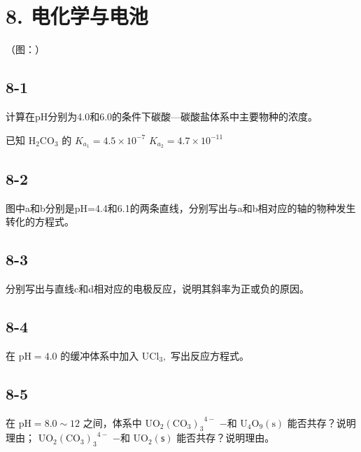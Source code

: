 \section*{8. 电化学与电池}
（图：）

\subsection*{8-1}
计算在pH分别为4.0和6.0的条件下碳酸—碳酸盐体系中主要物种的浓度。

已知 $\mathrm { H _ { 2 } C O _ { 3 } }$ 的 $K _ { a _ { 1 } } = 4 . 5 \times 1 0 ^ { - 7 }$ $K _ { a _ { 2 } } = 4 . 7 \times 1 0 ^ { - 1 1 }$

\subsection*{8-2}
图中a和b分别是pH=4.4和6.1的两条直线，分别写出与a和b相对应的轴的物种发⽣转化的⽅程式。

\subsection*{8-3}
分别写出与直线c和d相对应的电极反应，说明其斜率为正或负的原因。

\subsection*{8-4}
在 $\mathrm { p H } = 4 . 0$ 的缓冲体系中加⼊ $\mathrm { U C l _ { 3 } } ,$ 写出反应⽅程式。

\subsection*{8-5}
在 $\mathrm { p H } = 8 . 0 { \sim } 1 2$ 之间，体系中 $\mathrm { U O _ { 2 } ( C O _ { 3 } ) _ { 3 } } ^ { 4 - }$ −和 $\mathrm { U } _ { 4 } \mathrm { O } _ { 9 } ( \mathrm { s } )$ 能否共存？说明理由； $\mathrm { U O _ { 2 } ( C O _ { 3 } ) _ { 3 } } ^ { 4 - }$ −和 $\mathrm { U O } _ { 2 } ( \mathsf { s } )$ 能否共存？说明理由。
